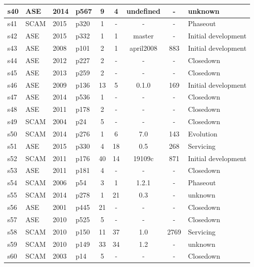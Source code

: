 \begin{longtable}{| l | l | l | l | c | c | c | c | l |}
    \hline
s40 & ASE & 2014 & p567 & 9 & 4 & undefined & - & unknown \\
    \hline
s41 & SCAM & 2015 & p320 & 1 & - & - & - & Phaseout \\
    \hline
s42 & ASE & 2015 & p332 & 1 & 1 & master & - & Initial development \\
    \hline
s43 & ASE & 2008 & p101 & 2 & 1 & april2008 & 883 & Initial development \\
    \hline
s44 & ASE & 2012 & p227 & 2 & - & - & - & Closedown \\
    \hline
s45 & ASE & 2013 & p259 & 2 & - & - & - & Closedown \\
    \hline
s46 & ASE & 2009 & p136 & 13 & 5 & 0.1.0 & 169 & Initial development \\
    \hline
s47 & ASE & 2014 & p536 & 1 & - & - & - & Closedown \\
    \hline
s48 & ASE & 2011 & p178 & 2 & - & - & - & Closedown \\
    \hline
s49 & SCAM & 2004 & p24 & 5 & - & - & - & Closedown \\
    \hline
s50 & SCAM & 2014 & p276 & 1 & 6 & 7.0 & 143 & Evolution \\
    \hline
s51 & ASE & 2015 & p330 & 4 & 18 & 0.5 & 268 & Servicing \\
    \hline
s52 & SCAM & 2011 & p176 & 40 & 14 & 19109c & 871 & Initial development \\
    \hline
s53 & ASE & 2011 & p181 & 4 & - & - & - & Closedown \\
    \hline
s54 & SCAM & 2006 & p54 & 3 & 1 & 1.2.1 & - & Phaseout \\
    \hline
s55 & SCAM & 2014 & p278 & 1 & 21 & 0.3 & - & unknown \\
    \hline
s56 & ASE & 2001 & p445 & 21 & - & - & - & Closedown \\
    \hline
s57 & ASE & 2010 & p525 & 5 & - & - & - & Closedown \\
    \hline
s58 & SCAM & 2010 & p150 & 11 & 37 & 1.0 & 2769 & Servicing \\
    \hline
s59 & SCAM & 2010 & p149 & 33 & 34 & 1.2 & - & unknown \\
    \hline
s60 & SCAM & 2003 & p14 & 5 & - & - & - & Closedown \\
    \hline
  \hline
\end{longtable}
